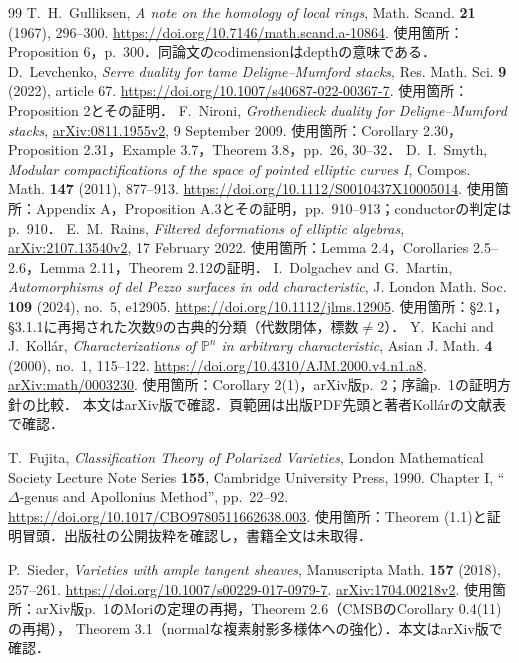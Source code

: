 \documentclass[11pt,a4paper]{ltjsarticle}
\begin{document}
\begin{thebibliography}{99}
 T.~H.~Gulliksen,
\emph{A note on the homology of local rings}, Math. Scand. \textbf{21} (1967), 296--300.
\url{https://doi.org/10.7146/math.scand.a-10864}.
使用箇所：Proposition 6，p.~300．同論文のcodimensionはdepthの意味である．
 D.~Levchenko,
\emph{Serre duality for tame Deligne--Mumford stacks}, Res. Math. Sci. \textbf{9} (2022), article 67.
\url{https://doi.org/10.1007/s40687-022-00367-7}.
使用箇所：Proposition 2とその証明．
 F.~Nironi,
\emph{Grothendieck duality for Deligne--Mumford stacks},
\href{https://arxiv.org/abs/0811.1955v2}{arXiv:0811.1955v2}, 9 September 2009.
使用箇所：Corollary 2.30，Proposition 2.31，Example 3.7，Theorem 3.8，pp.~26, 30--32．
 D.~I.~Smyth,
\emph{Modular compactifications of the space of pointed elliptic curves I},
Compos. Math. \textbf{147} (2011), 877--913.
\url{https://doi.org/10.1112/S0010437X10005014}.
使用箇所：Appendix A，Proposition A.3とその証明，pp.~910--913；conductorの判定はp.~910．
 E.~M.~Rains,
\emph{Filtered deformations of elliptic algebras},
\href{https://arxiv.org/abs/2107.13540v2}{arXiv:2107.13540v2}, 17 February 2022.
使用箇所：Lemma 2.4，Corollaries 2.5--2.6，Lemma 2.11，Theorem 2.12の証明．
 I.~Dolgachev and G.~Martin,
\emph{Automorphisms of del Pezzo surfaces in odd characteristic},
J. London Math. Soc. \textbf{109} (2024), no.~5, e12905.
\url{https://doi.org/10.1112/jlms.12905}.
使用箇所：\S2.1，\S3.1.1に再掲された次数9の古典的分類（代数閉体，標数$\ne2$）．
 Y.~Kachi and J.~Koll\'ar,
\emph{Characterizations of $\mathbb P^n$ in arbitrary characteristic},
Asian J. Math. \textbf{4} (2000), no.~1, 115--122.
\url{https://doi.org/10.4310/AJM.2000.v4.n1.a8}.
\href{https://arxiv.org/abs/math/0003230}{arXiv:math/0003230}.
使用箇所：Corollary 2(1)，arXiv版p.~2；序論p.~1の証明方針の比較．
本文はarXiv版で確認．頁範囲は出版PDF先頭と著者Koll\'arの文献表で確認．

 T.~Fujita,
\emph{Classification Theory of Polarized Varieties},
London Mathematical Society Lecture Note Series \textbf{155}, Cambridge University Press, 1990.
Chapter I, ``$\Delta$-genus and Apollonius Method'', pp.~22--92.
\url{https://doi.org/10.1017/CBO9780511662638.003}.
使用箇所：Theorem (1.1)と証明冒頭．出版社の公開抜粋を確認し，書籍全文は未取得．

 P.~Sieder,
\emph{Varieties with ample tangent sheaves},
Manuscripta Math. \textbf{157} (2018), 257--261.
\url{https://doi.org/10.1007/s00229-017-0979-7}.
\href{https://arxiv.org/abs/1704.00218v2}{arXiv:1704.00218v2}.
使用箇所：arXiv版p.~1のMoriの定理の再掲，Theorem 2.6（CMSBのCorollary 0.4(11)の再掲），
Theorem 3.1（normalな複素射影多様体への強化）．本文はarXiv版で確認．


\end{thebibliography}
\end{document}
